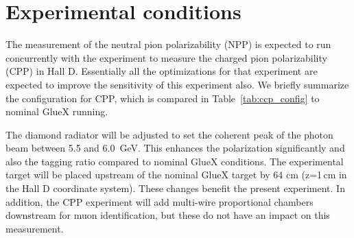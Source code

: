 
\section{Experimental conditions}
The measurement of the neutral pion polarizability (NPP) is expected to run
concurrently with the experiment to measure the charged pion
polarizability (CPP) \cite{CPPexp} in Hall D. Essentially all the
optimizations for that experiment are expected to improve the
sensitivity of this experiment also. We briefly summarize the
configuration for CPP, which is compared in
Table~\ref{tab:ccp_config} to nominal GlueX running.  
 
The diamond radiator will be adjusted to set the coherent peak of the
photon beam between 5.5 and 6.0~GeV. This enhances the polarization
significantly and also the tagging ratio compared to nominal GlueX conditions.
The experimental target
will be placed upstream of the nominal GlueX target by 64 cm (z=1\,cm
in the Hall D coordinate system). These changes benefit the present
experiment. In addition, the CPP experiment will add multi-wire
proportional chambers downstream for muon identification, but these do
not have an impact on this measurement.
 
